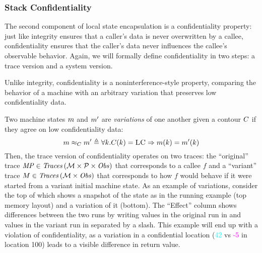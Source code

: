 \documentclass[acmsmall,review,anonymous]{acmart}\settopmatter{printfolios=true,printccs=false,printacmref=false}
\begin{document}
{%
%

\subsubsection{Stack Confidentiality}

The second component of local state encapsulation is a confidentiality
property: just like integrity ensures that a caller's data is never
overwritten by a callee, confidentiality ensures that the caller's data never
influences the callee's observable behavior. Again, we will formally define
confidentiality in two steps: a trace version and a system
version.

Unlike integrity, confidentiality is a noninterference-style property,
comparing the behavior of a machine with an arbitrary variation that
preserves low confidentiality data.

Two machine states \(m\) and \(m'\) are {\em variations}
of one another given a contour \(C\) if they agree on low
confidentiality data:
%
\[
m \approx_C m' \triangleq \forall k .
C(k) = \textsc{LC} \Rightarrow m(k) =
m'(k)
\]
%
Then, the trace version of confidentiality operates on two traces: the
``original'' trace $\mathit{MP} \in \mathit{Traces}\,({\mathcal M} \times \mathcal{P} \times \mathit{Obs})$ that corresponds to a callee $f$
and a ``variant'' trace $M \in \mathit{Traces}\,({\mathcal M} \times \mathit{Obs})$ that corresponds to how $f$
would behave if it were started from a variant initial machine state.
%
As an example of variations, consider the top of 
which shows a snapshot of the state as in the running example (top
memory layout) and a variation of it (bottom).
%
The ``Effect'' column shows differences between the two runs by writing values
in the original run in {\high} and values in the variant run in {\varied}
separated by a slash.
%
This example will end up with a violation of confidentiality, as a
variation in a confidential location (\textcolor{cyan}{42} vs
\textcolor{magenta}{-5} in location 100) leads to a visible
difference in return value.

}
\end{document}
